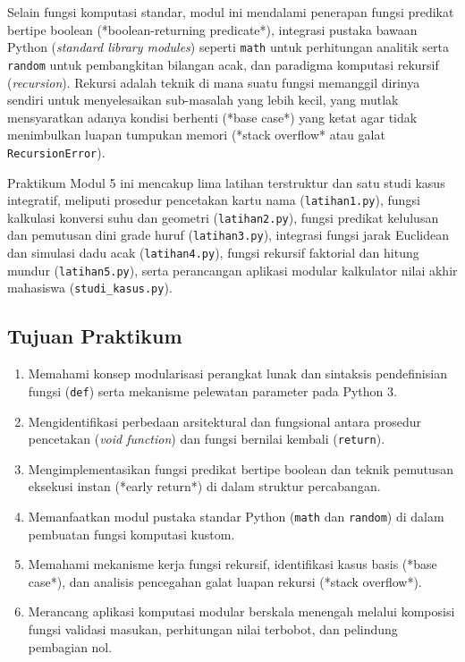 \documentclass[12pt,a4paper]{article}
\begin{document}
Selain fungsi komputasi standar, modul ini mendalami penerapan fungsi predikat bertipe boolean (*boolean-returning predicate*), integrasi pustaka bawaan Python (\textit{standard library modules}) seperti \texttt{math} untuk perhitungan analitik serta \texttt{random} untuk pembangkitan bilangan acak, dan paradigma komputasi rekursif (\textit{recursion}). Rekursi adalah teknik di mana suatu fungsi memanggil dirinya sendiri untuk menyelesaikan sub-masalah yang lebih kecil, yang mutlak mensyaratkan adanya kondisi berhenti (*base case*) yang ketat agar tidak menimbulkan luapan tumpukan memori (*stack overflow* atau galat \texttt{RecursionError}).

Praktikum Modul 5 ini mencakup lima latihan terstruktur dan satu studi kasus integratif, meliputi prosedur pencetakan kartu nama (\texttt{latihan1.py}), fungsi kalkulasi konversi suhu dan geometri (\texttt{latihan2.py}), fungsi predikat kelulusan dan pemutusan dini grade huruf (\texttt{latihan3.py}), integrasi fungsi jarak Euclidean dan simulasi dadu acak (\texttt{latihan4.py}), fungsi rekursif faktorial dan hitung mundur (\texttt{latihan5.py}), serta perancangan aplikasi modular kalkulator nilai akhir mahasiswa (\texttt{studi\_kasus.py}).

\subsection{Tujuan Praktikum}
\begin{enumerate}
    \item Memahami konsep modularisasi perangkat lunak dan sintaksis pendefinisian fungsi (\texttt{def}) serta mekanisme pelewatan parameter pada Python 3.
    \item Mengidentifikasi perbedaan arsitektural dan fungsional antara prosedur pencetakan (\textit{void function}) dan fungsi bernilai kembali (\texttt{return}).
    \item Mengimplementasikan fungsi predikat bertipe boolean dan teknik pemutusan eksekusi instan (*early return*) di dalam struktur percabangan.
    \item Memanfaatkan modul pustaka standar Python (\texttt{math} dan \texttt{random}) di dalam pembuatan fungsi komputasi kustom.
    \item Memahami mekanisme kerja fungsi rekursif, identifikasi kasus basis (*base case*), dan analisis pencegahan galat luapan rekursi (*stack overflow*).
    \item Merancang aplikasi komputasi modular berskala menengah melalui komposisi fungsi validasi masukan, perhitungan nilai terbobot, dan pelindung pembagian nol.
\end{enumerate}
\end{document}
